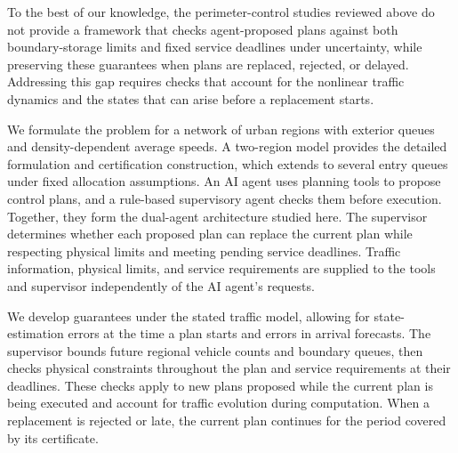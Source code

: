 \documentclass[preprint,12pt]{elsarticle}
\theoremstyle{definition}
\theoremstyle{plain}
\theoremstyle{definition}
\theoremstyle{plain}
\begin{document}
To the best of our knowledge, the perimeter-control studies reviewed
above do not provide a framework
that checks agent-proposed plans against both boundary-storage limits and
fixed service deadlines under uncertainty, while preserving these
guarantees when plans are replaced, rejected, or delayed. Addressing this
gap requires checks that account for the nonlinear traffic dynamics and
the states that can arise before a replacement starts.

We formulate the problem for a network of urban regions with exterior
queues and density-dependent average speeds. A two-region model provides
the detailed formulation and certification construction, which extends
to several entry queues under fixed allocation assumptions. An AI agent
uses planning tools to propose control plans, and a rule-based
supervisory agent checks them before execution. Together, they form the
dual-agent architecture studied here. The supervisor determines whether
each proposed plan can replace the current plan while respecting physical
limits and meeting pending service deadlines. Traffic information,
physical limits, and service requirements are supplied to the tools and
supervisor independently of the AI agent's requests.

We develop guarantees under the stated traffic model, allowing for
state-estimation errors at the time a plan starts and errors in arrival
forecasts. The supervisor bounds future regional vehicle counts and
boundary queues, then checks physical constraints throughout the plan and
service requirements at their deadlines. These checks apply to new plans
proposed while the current plan is being executed and account for traffic
evolution during computation. When a replacement is rejected or late,
the current plan continues for the period covered by its certificate.
\end{document}
